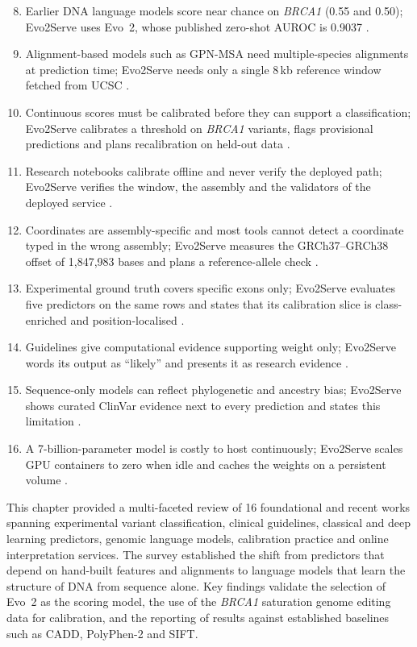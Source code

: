 \begin{enumerate}
\setcounter{enumi}{7}
\setlength{\itemsep}{12pt}
\item Earlier DNA language models score near chance on \textit{BRCA1} (0.55 and 0.50); Evo2Serve uses Evo~2, whose published zero-shot AUROC is 0.9037 \cite{dallatorre2024nt,nguyen2024evo,brixi2026evo2}.
\item Alignment-based models such as GPN-MSA need multiple-species alignments at prediction time; Evo2Serve needs only a single 8\,kb reference window fetched from UCSC \cite{benegas2025gpnmsa}.
\item Continuous scores must be calibrated before they can support a classification; Evo2Serve calibrates a threshold on \textit{BRCA1} variants, flags provisional predictions and plans recalibration on held-out data \cite{pejaver2022svi}.
\item Research notebooks calibrate offline and never verify the deployed path; Evo2Serve verifies the window, the assembly and the validators of the deployed service \cite{brixi2026evo2}.
\item Coordinates are assembly-specific and most tools cannot detect a coordinate typed in the wrong assembly; Evo2Serve measures the GRCh37--GRCh38 offset of 1,847,983 bases and plans a reference-allele check \cite{lee2022ucsc}.
\item Experimental ground truth covers specific exons only; Evo2Serve evaluates five predictors on the same rows and states that its calibration slice is class-enriched and position-localised \cite{findlay2018brca1}.
\item Guidelines give computational evidence supporting weight only; Evo2Serve words its output as ``likely'' and presents it as research evidence \cite{richards2015acmg}.
\item Sequence-only models can reflect phylogenetic and ancestry bias; Evo2Serve shows curated ClinVar evidence next to every prediction and states this limitation \cite{pugh2025likelihood,pathak2024ancestry}.
\item A 7-billion-parameter model is costly to host continuously; Evo2Serve scales GPU containers to zero when idle and caches the weights on a persistent volume \cite{brixi2026evo2}.
\end{enumerate}

\newpage
{}
This chapter provided a multi-faceted review of 16 foundational and recent works spanning experimental variant classification, clinical guidelines, classical and deep learning predictors, genomic language models, calibration practice and online interpretation services. The survey established the shift from predictors that depend on hand-built features and alignments to language models that learn the structure of DNA from sequence alone. Key findings validate the selection of Evo~2 as the scoring model, the use of the \textit{BRCA1} saturation genome editing data for calibration, and the reporting of results against established baselines such as CADD, PolyPhen-2 and SIFT.


